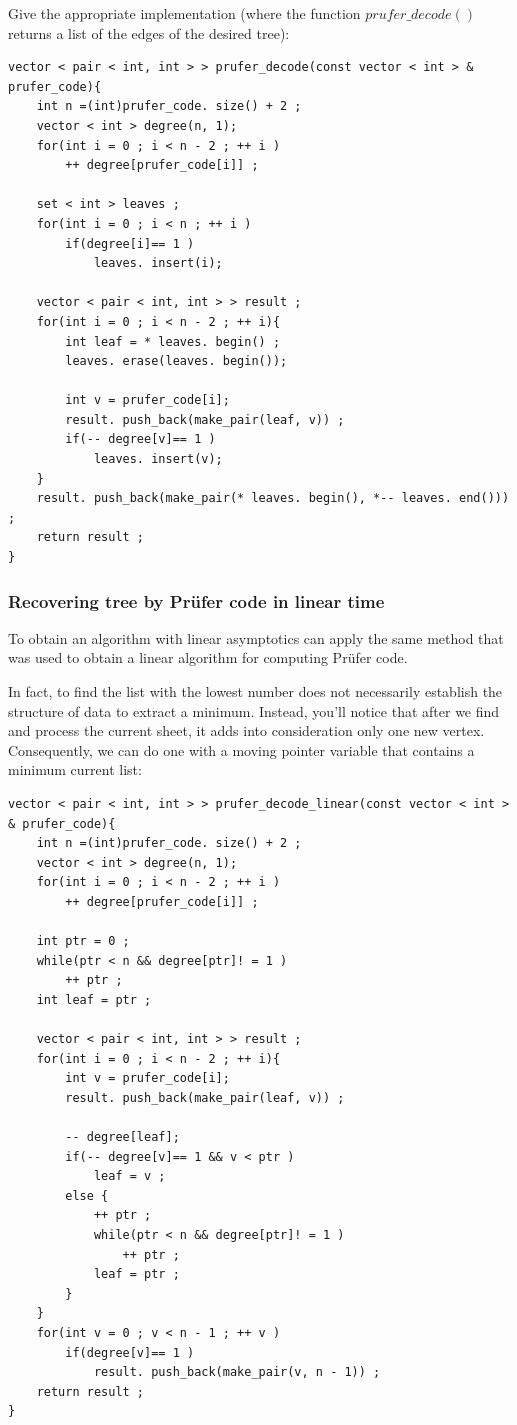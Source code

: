 Give the appropriate implementation (where the function $prufer \_decode()$ returns a list of the edges of the desired tree):

\begin{verbatim}
vector < pair < int, int > > prufer_decode(const vector < int > & prufer_code){
    int n =(int)prufer_code. size() + 2 ;
    vector < int > degree(n, 1);
    for(int i = 0 ; i < n - 2 ; ++ i )
        ++ degree[prufer_code[i]] ;
 
    set < int > leaves ;
    for(int i = 0 ; i < n ; ++ i )
        if(degree[i]== 1 )
            leaves. insert(i);
 
    vector < pair < int, int > > result ;
    for(int i = 0 ; i < n - 2 ; ++ i){
        int leaf = * leaves. begin() ;
        leaves. erase(leaves. begin());
 
        int v = prufer_code[i];
        result. push_back(make_pair(leaf, v)) ;
        if(-- degree[v]== 1 )
            leaves. insert(v);
    }
    result. push_back(make_pair(* leaves. begin(), *-- leaves. end())) ;
    return result ;
} 
\end{verbatim}
\subsubsection{ Recovering tree by Prüfer code in linear time }

To obtain an algorithm with linear asymptotics can apply the same method that was used to obtain a linear algorithm for computing Prüfer code.

In fact, to find the list with the lowest number does not necessarily establish the structure of data to extract a minimum. Instead, you'll notice that after we find and process the current sheet, it adds into consideration only one new vertex. Consequently, we can do one with a moving pointer variable that contains a minimum current list:

\begin{verbatim}
vector < pair < int, int > > prufer_decode_linear(const vector < int > & prufer_code){
    int n =(int)prufer_code. size() + 2 ;
    vector < int > degree(n, 1);
    for(int i = 0 ; i < n - 2 ; ++ i )
        ++ degree[prufer_code[i]] ;
 
    int ptr = 0 ;
    while(ptr < n && degree[ptr]! = 1 )
        ++ ptr ;
    int leaf = ptr ;
 
    vector < pair < int, int > > result ;
    for(int i = 0 ; i < n - 2 ; ++ i){
        int v = prufer_code[i];
        result. push_back(make_pair(leaf, v)) ;
 
        -- degree[leaf];
        if(-- degree[v]== 1 && v < ptr )
            leaf = v ;
        else {
            ++ ptr ;
            while(ptr < n && degree[ptr]! = 1 )
                ++ ptr ;
            leaf = ptr ;
        }
    }
    for(int v = 0 ; v < n - 1 ; ++ v )
        if(degree[v]== 1 )
            result. push_back(make_pair(v, n - 1)) ;
    return result ;
} 
\end{verbatim}
